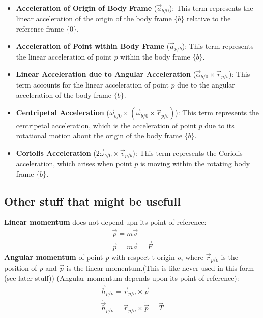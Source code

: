 \begin{itemize}
    \item \textbf{Acceleration of Origin of Body Frame} (\( \vec{a}_{b/0} \)): This term represents the linear acceleration of the origin of the body frame \( \{b\} \) relative to the reference frame \( \{0\} \).
    \item \textbf{Acceleration of Point within Body Frame} (\( \vec{a}_{p/b} \)): This term represents the linear acceleration of point \( p \) within the body frame \( \{b\} \).
    \item \textbf{Linear Acceleration due to Angular Acceleration} (\( \vec{\alpha}_{b/0} \times \vec{r}_{p/b} \)): This term accounts for the linear acceleration of point \( p \) due to the angular acceleration of the body frame \( \{b\} \).
    \item \textbf{Centripetal Acceleration} (\( \vec{\omega}_{b/0} \times (\vec{\omega}_{b/0} \times \vec{r}_{p/b}) \)): This term represents the centripetal acceleration, which is the acceleration of point \( p \) due to its rotational motion about the origin of the body frame \( \{b\} \).
    \item \textbf{Coriolis Acceleration} (\( 2 \vec{\omega}_{b/0} \times \vec{v}_{p/b} \)): This term represents the Coriolis acceleration, which arises when point \( p \) is moving within the rotating body frame \( \{b\} \).
\end{itemize}



\subsection{Other stuff that might be usefull}
\textbf{Linear momentum} does not depend upn its point of reference:
\begin{subequations}
    \begin{align}
        \vec{p} = m\vec{v} \\
        \dot{\vec{p}} = m\vec{a} = \vec{F}
    \end{align}
\end{subequations}
\textbf{Angular momentum} of point \textit{p} with respect t origin \textit{o}, where $\vec{r}_{p/o}$ is the position of \textit{p} and $\vec{p}$ is the linear momentum.(This is like never used in this form (see later stuff)) (Angular momentum depends upon its point of reference):
\begin{subequations}
    \begin{align}
        \vec{h}_{p/o} = \vec{r}_{p/o} \times \vec{p} \\
        \dot{\vec{h}}_{p/o} = \vec{r}_{p/o} \times \dot{\vec{p}} = \vec{T}
    \end{align}
\end{subequations}